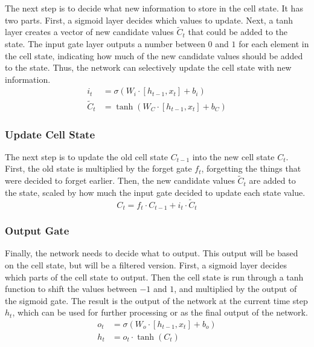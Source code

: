\documentclass{article}
\begin{document}
The next step is to decide what new information to store in the cell state. It has two
parts. First, a sigmoid layer decides which values to update. Next, a tanh layer creates a
vector of new candidate values $\tilde{C}_t$ that could be added to the state. The input
gate layer outputs a number between $0$ and $1$ for each element in the cell state,
indicating how much of the new candidate values should be added to the state. Thus, the
network can selectively update the cell state with new information.
\begin{align}
  i_t         & = \sigma(W_i \cdot [h_{t-1}, x_t] + b_i) \\
  \tilde{C}_t & = \tanh(W_C \cdot [h_{t-1}, x_t] + b_C)
\end{align}


\subsubsection{Update Cell State}
\label{sec:3.0.2}

The next step is to update the old cell state $C_{t-1}$ into the new cell state $C_t$.
First, the old state is multiplied by the forget gate $f_t$, forgetting the things that
were decided to forget earlier. Then, the new candidate values $\tilde{C}_t$ are added to
the state, scaled by how much the input gate decided to update each state value.
\begin{equation}
  C_t = f_t \cdot C_{t-1} + i_t \cdot \tilde{C}_t
\end{equation}


\subsubsection{Output Gate}
\label{sec:3.0.3}

Finally, the network needs to decide what to output. This output will be based on the cell
state, but will be a filtered version. First, a sigmoid layer decides which parts of the
cell state to output. Then the cell state is run through a tanh function to shift the
values between $-1$ and $1$, and multiplied by the output of the sigmoid gate. The result
is the output of the network at the current time step $h_t$, which can be used for further
processing or as the final output of the network.
\begin{align}
  o_t & = \sigma(W_o \cdot [h_{t-1}, x_t] + b_o) \\
  h_t & = o_t \cdot \tanh(C_t)
\end{align}
\end{document}
